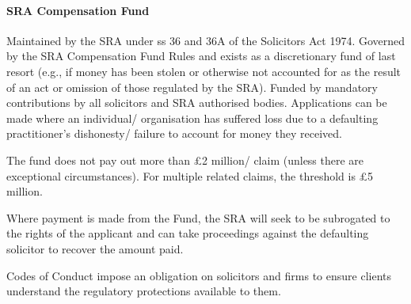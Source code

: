 \documentclass[
]{article}
\begin{document}
\hypertarget{sra-compensation-fund}{%
\paragraph{SRA Compensation Fund}\label{sra-compensation-fund}}

Maintained by the SRA under ss 36 and 36A of the Solicitors Act 1974.
Governed by the SRA Compensation Fund Rules and exists as a
discretionary fund of last resort (e.g., if money has been stolen or
otherwise not accounted for as the result of an act or omission of those
regulated by the SRA). Funded by mandatory contributions by all
solicitors and SRA authorised bodies. Applications can be made where an
individual/ organisation has suffered loss due to a defaulting
practitioner's dishonesty/ failure to account for money they received.

The fund does not pay out more than £2 million/ claim (unless there are
exceptional circumstances). For multiple related claims, the threshold
is £5 million.

Where payment is made from the Fund, the SRA will seek to be subrogated
to the rights of the applicant and can take proceedings against the
defaulting solicitor to recover the amount paid.

Codes of Conduct impose an obligation on solicitors and firms to ensure
clients understand the regulatory protections available to them.
\end{document}
